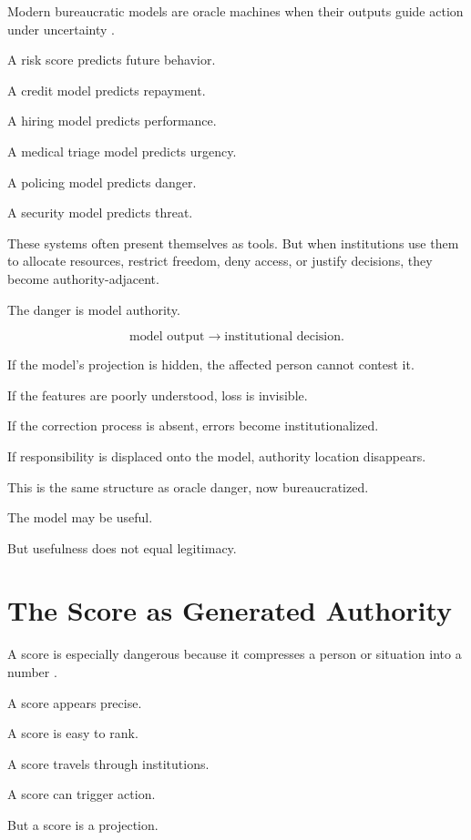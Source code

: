 \documentclass[11pt]{book}
\begin{document}
Modern bureaucratic models are oracle machines when their outputs guide action under uncertainty \cite{OConnor2016WeaponsMathDestruction,Eubanks2018AutomatingInequality,Noble2018AlgorithmsOppression}.

A risk score predicts future behavior.

A credit model predicts repayment.

A hiring model predicts performance.

A medical triage model predicts urgency.

A policing model predicts danger.

A security model predicts threat.

These systems often present themselves as tools. But when institutions use them to allocate resources, restrict freedom, deny access, or justify decisions, they become authority-adjacent.

The danger is model authority.

\[
\text{model output}
\rightarrow
\text{institutional decision}.
\]

If the model's projection is hidden, the affected person cannot contest it.

If the features are poorly understood, loss is invisible.

If the correction process is absent, errors become institutionalized.

If responsibility is displaced onto the model, authority location disappears.

This is the same structure as oracle danger, now bureaucratized.

The model may be useful.

But usefulness does not equal legitimacy.

\section{The Score as Generated Authority}

A score is especially dangerous because it compresses a person or situation into a number \cite{OConnor2016WeaponsMathDestruction,Eubanks2018AutomatingInequality}.

A score appears precise.

A score is easy to rank.

A score travels through institutions.

A score can trigger action.

But a score is a projection.
\end{document}
